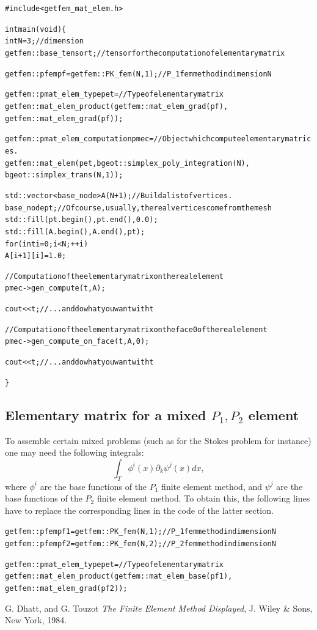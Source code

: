 \documentclass[11pt,a4paper]{article}
\begin{document}
\begin{alltt}
#include<getfem_mat_elem.h>

int main(void) \{
  int N = 3;                // dimension
  getfem::base_tensor t;    // tensor for the computation of elementary matrix

  getfem::pfem pf = getfem::PK_fem(N, 1); // P_1 fem method in dimension N

  getfem::pmat_elem_type pet = // Type of elementary matrix
     getfem::mat_elem_product(getfem::mat_elem_grad(pf),
                              getfem::mat_elem_grad(pf));

  getfem::pmat_elem_computation pmec = // Object which compute elementary matrices.
     getfem::mat_elem(pet, bgeot::simplex_poly_integration(N),
                           bgeot::simplex_trans(N, 1));

  std::vector<base_node> A(N+1);  // Build a list of vertices.
  base_node pt;  // Of course, usually, the real vertices come from the mesh
  std::fill(pt.begin(), pt.end(), 0.0);
  std::fill(A.begin(), A.end(), pt);
  for (int i = 0; i < N; ++i)
    A[i+1][i] = 1.0;

  // Computation of the elementary matrix on the real element
  pmec->gen_compute(t, A);

  cout << t; // ... and do what you want with t  

  // Computation of the elementary matrix on the face 0 of the real element
  pmec->gen_compute_on_face(t, A, 0); 

  cout << t; // ... and do what you want with t  

\}

\end{alltt}

\subsection{Elementary matrix for a mixed $P_1, P_2$ element}

To assemble certain mixed problems (such as for the Stokes problem for instance) one may need the following integrals:
$$ \int_T \phi^i(x) \partial_k \psi^j(x) dx, $$
where $\phi^i$ are the base functions of the $P_1$ finite element method, and $\psi^j$ are the base functions of the $P_2$ finite element method. To obtain this, the following lines have to replace the corresponding lines in the code of the latter section.

\begin{alltt}

  getfem::pfem pf1 = getfem::PK_fem(N, 1); // P_1 fem method in dimension N
  getfem::pfem pf2 = getfem::PK_fem(N, 2); // P_2 fem method in dimension N  

  getfem::pmat_elem_type pet = // Type of elementary matrix
     getfem::mat_elem_product(getfem::mat_elem_base(pf1),
                              getfem::mat_elem_grad(pf2));
                              
\end{alltt}


\begin{thebibliography}{99}
% 
% 
% 
  G. {\sc Dhatt, and  G. Touzot}
  {\it The Finite Element Method Displayed}, 
 J. Wiley \& Sons,  New York, 1984.
\end{thebibliography}
\end{document}
